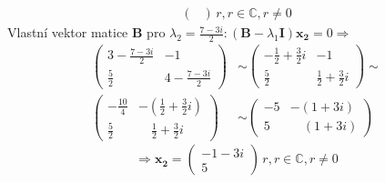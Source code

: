 \begin{mdframed}[style=mdexam]
\begin{example}
\begin{align*}
\begin{pmatrix}
      \end{pmatrix}
      \, r, r\in\mathbb{C}, r\neq0
    \end{align*}
    Vlastní vektor matice \(\mathbf{B}\) pro \(\lambda_2=\frac{7-3i}{2}: (\mathbf{B} -
    \lambda_1\mathbf{I})\mathbf{x_2}=0 \Rightarrow\)
    \begin{align*}
      \begin{pmatrix}
        3  - \frac{7-3i}{2}       &  -1                                     \\
        \frac{5}{2}               &  4 - \frac{7-3i}{2}
      \end{pmatrix}
      &\sim
      \begin{pmatrix}
        -\frac{1}{2}+\frac{3}{2}i  &  -1                                     \\
        \frac{5}{2}                & \frac{1}{2}+\frac{3}{2}i
      \end{pmatrix}                                 
      \sim                                                                          \\
      \begin{pmatrix}
        -\frac{10}{4}              &-\left(\frac{1}{2} +\frac{3}{2}i\right)  \\
        \frac{5}{2}                & \quad\frac{1}{2}+\frac{3}{2}i
      \end{pmatrix}
      &\sim                                                                   
      \begin{pmatrix}
        -5                         &-\left(1+3i\right)                       \\
        5                          & \quad\left(1+3i\right)
      \end{pmatrix}
    \end{align*} 
    \begin{equation*} 
      \Rightarrow \mathbf{x_2}=
      \begin{pmatrix}
        -1-3i \\ 5
      \end{pmatrix}
      \, r, r\in\mathbb{C}, r\neq0
    \end{equation*}
  
  \end{example}
\end{mdframed}